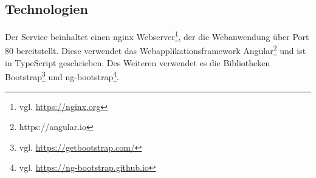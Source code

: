 \subsection{Technologien}
    Der Service beinhaltet einen nginx Webserver\footnote{vgl. \url{https://nginx.org}},
    der die Webanwendung über Port 80 bereitstellt.
    Diese verwendet das Webapplikationsframework Angular\footnote{https://angular.io}
    und ist in TypeScript geschrieben.
    Des Weiteren verwendet es die Bibliotheken
    Bootstrap\footnote{vgl. \url{https://getbootstrap.com/}}
    und ng-bootstrap\footnote{vgl. \url{https://ng-bootstrap.github.io}}.
